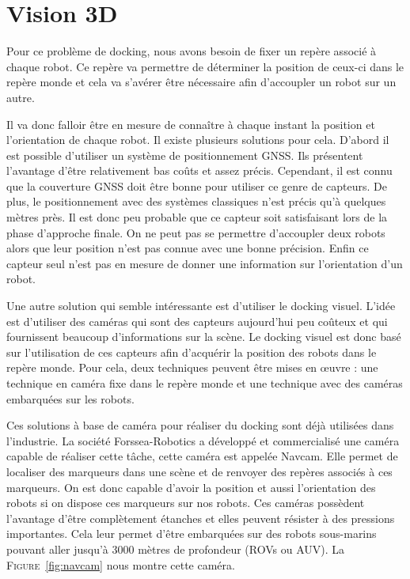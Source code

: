 \section{Vision 3D}
    Pour ce problème de docking, nous avons besoin de fixer un repère associé à chaque robot. Ce repère va permettre de déterminer la position de ceux-ci dans le repère monde et cela va s’avérer être nécessaire afin d’accoupler un robot sur un autre.

    Il va donc falloir être en mesure de connaître à chaque instant la position et l’orientation de chaque robot. Il existe plusieurs solutions pour cela. D’abord il est possible d’utiliser un système de positionnement GNSS. Ils présentent l’avantage d’être relativement bas coûts et assez précis. Cependant, il est connu que la couverture GNSS doit être bonne pour utiliser ce genre de capteurs. De plus, le positionnement avec des systèmes classiques n’est précis qu’à quelques mètres près. Il est donc peu probable que ce capteur soit satisfaisant lors de la phase d’approche finale. On ne peut pas se permettre d’accoupler deux robots alors que leur position n’est pas connue avec une bonne précision. Enfin ce capteur seul n’est pas en mesure de donner une information sur l’orientation d’un robot.

    Une autre solution qui semble intéressante est d’utiliser le docking visuel. L’idée est d’utiliser des caméras qui sont des capteurs aujourd’hui peu coûteux et qui fournissent beaucoup d’informations sur la scène. Le docking visuel est donc basé sur l’utilisation de ces capteurs afin d’acquérir la position des robots dans le repère monde. Pour cela, deux techniques peuvent être mises en œuvre : une technique en caméra fixe dans le repère monde et une technique avec des caméras embarquées sur les robots.

    Ces solutions à base de caméra pour réaliser du docking sont déjà utilisées dans l’industrie. La société Forssea-Robotics a développé et commercialisé une caméra capable de réaliser cette tâche, cette caméra est appelée Navcam. Elle permet de localiser des marqueurs dans une scène et de renvoyer des repères associés à ces marqueurs. On est donc capable d’avoir la position et aussi l’orientation des robots si on dispose ces marqueurs sur nos robots. Ces caméras possèdent l’avantage d’être complètement étanches et elles peuvent résister à des pressions importantes. Cela leur permet d’être embarquées sur des robots sous-marins pouvant aller jusqu’à 3000 mètres de profondeur (ROVs ou AUV). La \textsc{Figure}~\ref{fig:navcam} nous montre cette caméra.

